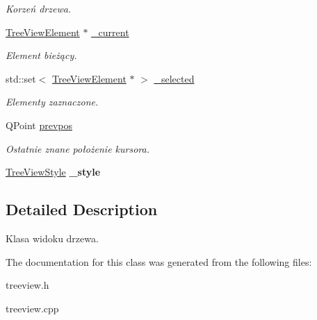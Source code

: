 \begin{DoxyCompactItemize}
\begin{DoxyCompactList}\small\item\em Korzeń drzewa. \item\end{DoxyCompactList}\item 
\hypertarget{class_tree_view_a847b5cd64aca025e2ae8d4349beef025}{
\hyperlink{class_tree_view_element}{TreeViewElement} $\ast$ \hyperlink{class_tree_view_a847b5cd64aca025e2ae8d4349beef025}{\_\-current}}
\label{class_tree_view_a847b5cd64aca025e2ae8d4349beef025}

\begin{DoxyCompactList}\small\item\em Element bieżący. \item\end{DoxyCompactList}\item 
\hypertarget{class_tree_view_a525b8577be010e620325f112540e8daf}{
std::set$<$ \hyperlink{class_tree_view_element}{TreeViewElement} $\ast$ $>$ \hyperlink{class_tree_view_a525b8577be010e620325f112540e8daf}{\_\-selected}}
\label{class_tree_view_a525b8577be010e620325f112540e8daf}

\begin{DoxyCompactList}\small\item\em Elementy zaznaczone. \item\end{DoxyCompactList}\item 
\hypertarget{class_tree_view_ac29362661362d4738dcc3019ba89dd7d}{
QPoint \hyperlink{class_tree_view_ac29362661362d4738dcc3019ba89dd7d}{prevpos}}
\label{class_tree_view_ac29362661362d4738dcc3019ba89dd7d}

\begin{DoxyCompactList}\small\item\em Ostatnie znane położenie kursora. \item\end{DoxyCompactList}\item 
\hypertarget{class_tree_view_a4cea4b93973813b5898ff3ebfad77924}{
\hyperlink{class_tree_view_style}{TreeViewStyle} {\bfseries \_\-style}}
\label{class_tree_view_a4cea4b93973813b5898ff3ebfad77924}

\end{DoxyCompactItemize}


\subsection{Detailed Description}
Klasa widoku drzewa. 

The documentation for this class was generated from the following files:\begin{DoxyCompactItemize}
\item 
treeview.h\item 
treeview.cpp\end{DoxyCompactItemize}
